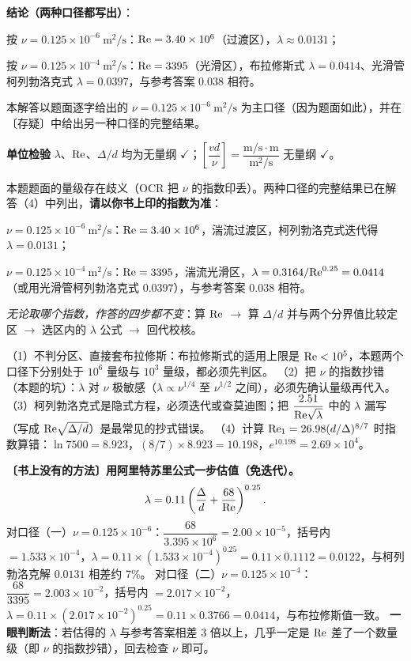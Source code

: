 \begin{jie}
\textbf{结论（两种口径都写出）}：
\begin{xiaowen}
\item 按 $\nu=0.125\times10^{-6}\ \mathrm{m^2/s}$：$\mathrm{Re}=3.40\times10^6$（过渡区），$\lambda\approx0.0131$；
\item 按 $\nu=0.125\times10^{-4}\ \mathrm{m^2/s}$：$\mathrm{Re}=3395$（光滑区），布拉修斯式 $\lambda=0.0414$、光滑管柯列勃洛克式 $\lambda=0.0397$，与参考答案 $0.038$ 相符。
\end{xiaowen}
本解答以题面逐字给出的 $\nu=0.125\times10^{-6}\ \mathrm{m^2/s}$ 为主口径（因为题面如此），并在〔存疑〕中给出另一种口径的完整结果。

\textbf{单位检验} $\lambda$、$\mathrm{Re}$、$\Delta/d$ 均为无量纲 $\checkmark$；$\left[\dfrac{vd}{\nu}\right]=\dfrac{\mathrm{m/s}\cdot\mathrm{m}}{\mathrm{m^2/s}}$ 无量纲 $\checkmark$。
\end{jie}
\begin{tishi}
本题题面的量级存在歧义（OCR 把 $\nu$ 的指数印丢）。两种口径的完整结果已在解答（4）中列出，\textbf{请以你书上印的指数为准}：
\begin{xiaowen}
\item $\nu=0.125\times10^{-6}\ \mathrm{m^2/s}$：$\mathrm{Re}=3.40\times10^6$，湍流过渡区，柯列勃洛克式迭代得 $\lambda=0.0131$；
\item $\nu=0.125\times10^{-4}\ \mathrm{m^2/s}$：$\mathrm{Re}=3395$，湍流光滑区，$\lambda=0.3164/\mathrm{Re}^{0.25}=0.0414$（或用光滑管柯列勃洛克式 $0.0397$），与参考答案 $0.038$ 相符。
\end{xiaowen}
\emph{无论取哪个指数，作答的四步都不变}：算 $\mathrm{Re}$ $\to$ 算 $\Delta/d$ 并与两个分界值比较定区 $\to$ 选区内的 $\lambda$ 公式 $\to$ 回代校核。
\end{tishi}
\begin{yicuo}
（1）不判分区、直接套布拉修斯：布拉修斯式的适用上限是 $\mathrm{Re}<10^5$，本题两个口径下分别处于 $10^6$ 量级与 $10^3$ 量级，都必须先判区。
（2）把 $\nu$ 的指数抄错（本题的坑）：$\lambda$ 对 $\nu$ 极敏感（$\lambda\propto\nu^{1/4}$ 至 $\nu^{1/2}$ 之间），必须先确认量级再代入。
（3）柯列勃洛克式是隐式方程，必须迭代或查莫迪图；把 $\dfrac{2.51}{\mathrm{Re}\sqrt\lambda}$ 中的 $\lambda$ 漏写（写成 $\mathrm{Re}\sqrt{\Delta/d}$）是最常见的抄式错误。
（4）计算 $\mathrm{Re}_1=26.98(d/\Delta)^{8/7}$ 时指数算错：$\ln 7500=8.923$，$(8/7)\times8.923=10.198$，$e^{10.198}=2.69\times10^4$。
\end{yicuo}
\begin{banfa}
\textbf{〔书上没有的方法〕用阿里特苏里公式一步估值（免迭代）。}
\[\lambda=0.11\left(\frac{\Delta}{d}+\frac{68}{\mathrm{Re}}\right)^{0.25}.\]
对口径（一）$\nu=0.125\times10^{-6}$：$\dfrac{68}{3.395\times10^6}=2.00\times10^{-5}$，括号内 $=1.533\times10^{-4}$，$\lambda=0.11\times(1.533\times10^{-4})^{0.25}=0.11\times0.1112=0.0122$，与柯列勃洛克解 $0.0131$ 相差约 7\%。
对口径（二）$\nu=0.125\times10^{-4}$：$\dfrac{68}{3395}=2.003\times10^{-2}$，括号内 $=2.017\times10^{-2}$，$\lambda=0.11\times(2.017\times10^{-2})^{0.25}=0.11\times0.3766=0.0414$，与布拉修斯值一致。
\textbf{一眼判断法}：若估得的 $\lambda$ 与参考答案相差 3 倍以上，几乎一定是 $\mathrm{Re}$ 差了一个数量级（即 $\nu$ 的指数抄错），回去检查 $\nu$ 即可。
\end{banfa}

